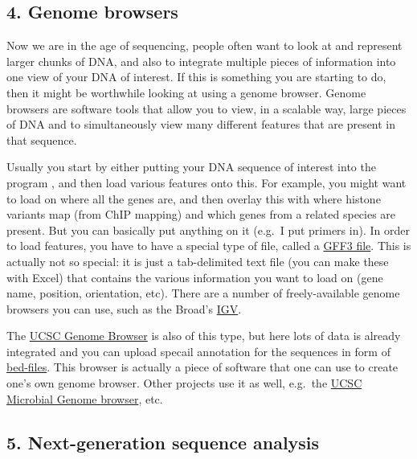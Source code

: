 \documentclass[]{article}
\begin{document}
\subsection{4. Genome browsers}\label{genome-browsers}

Now we are in the age of sequencing, people often want to look at and
represent larger chunks of DNA, and also to integrate multiple pieces of
information into one view of your DNA of interest. If this is something
you are starting to do, then it might be worthwhile looking at using a
genome browser. Genome browsers are software tools that allow you to
view, in a scalable way, large pieces of DNA and to simultaneously view
many different features that are present in that sequence.

Usually you start by either putting your DNA sequence of interest into
the program , and then load various features onto this. For example, you
might want to load on where all the genes are, and then overlay this
with where histone variants map (from ChIP mapping) and which genes from
a related species are present. But you can basically put anything on it
(e.g.~I put primers in). In order to load features, you have to have a
special type of file, called a
\href{http://compbio.massey.ac.nz/wiki/\#!bioinf_files.md}{GFF3 file}.
This is actually not so special: it is just a tab-delimited text file
(you can make these with Excel) that contains the various information
you want to load on (gene name, position, orientation, etc). There are a
number of freely-available genome browsers you can use, such as the
Broad's \href{https://www.broadinstitute.org/igv/home}{IGV}.

The \href{http://genome.ucsc.edu/}{UCSC Genome Browser} is also of this
type, but here lots of data is already integrated and you can upload
specail annotation for the sequences in form of
\href{http://compbio.massey.ac.nz/wiki/\#!bioinf_files.md}{bed-files}.
This browser is actually a piece of software that one can use to create
one's own genome browser. Other projects use it as well, e.g.~the
\href{http://microbes.ucsc.edu/}{UCSC Microbial Genome browser}, etc.

\subsection{5. Next-generation sequence
analysis}\label{next-generation-sequence-analysis}
\end{document}
